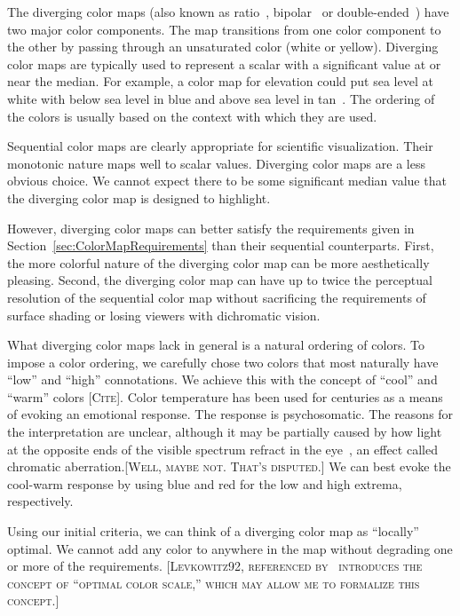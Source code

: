 \documentclass[twocolumn]{article}
\newcommand{\lcite}[1]{~\cite{#1}}
\newcommand{\sticky}[1]{\textsc{[#1]}}
\begin{document}
The diverging color maps (also known as ratio\lcite{Ware04},
bipolar\lcite{Spence01} or double-ended\lcite{Rheingans99}) have two major
color components.  The map transitions from one color component to the
other by passing through an unsaturated color (white or yellow).  Diverging
color maps are typically used to represent a scalar with a significant
value at or near the median.  For example, a color map for elevation could
put sea level at white with below sea level in blue and above sea level in
tan\lcite{Tufte97}.  The ordering of the colors is usually based on the
context with which they are used.

Sequential color maps are clearly appropriate for scientific visualization.
Their monotonic nature maps well to scalar values.  Diverging color maps
are a less obvious choice.  We cannot expect there to be some significant
median value that the diverging color map is designed to highlight.

However, diverging color maps can better satisfy the requirements given in
Section~\ref{sec:ColorMapRequirements} than their sequential counterparts.
First, the more colorful nature of the diverging color map can be more
aesthetically pleasing.  Second, the diverging color map can have up to
twice the perceptual resolution of the sequential color map without
sacrificing the requirements of surface shading or losing viewers
with dichromatic vision.

What diverging color maps lack in general is a natural ordering of colors.
To impose a color ordering, we carefully chose two colors that most
naturally have ``low'' and ``high'' connotations.  We achieve this with the
concept of ``cool'' and ``warm'' colors \sticky{Cite}.  Color temperature
has been used for centuries as a means of evoking an emotional response.
The response is psychosomatic.  The reasons for the interpretation are
unclear, although it may be partially caused by how light at the opposite
ends of the visible spectrum refract in the eye\lcite{Bailey06}, an effect
called chromatic aberration.\sticky{Well, maybe not.  That's disputed.}  We
can best evoke the cool-warm response by using blue and red for the low and
high extrema, respectively.

Using our initial criteria, we can think of a diverging color map as
``locally'' optimal.  We cannot add any color to anywhere in the map
without degrading one or more of the requirements. \sticky{Levkowitz92,
  referenced by\lcite{Rheingans99} introduces the concept of ``optimal
  color scale,'' which may allow me to formalize this concept.}
\end{document}
